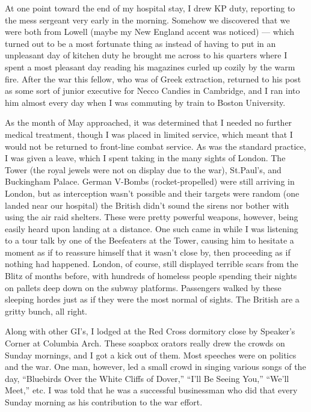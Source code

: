 \documentclass[../m3y]{subfiles}
\begin{document}
At one point toward the end of my hospital stay, I drew KP duty, reporting to the mess sergeant very early in the morning. Somehow we discovered that we were both from Lowell (maybe my New England accent was noticed) --- which turned out to be a most fortunate thing as instead of having to put in an unpleasant day of kitchen duty he brought me across to his quarters where I spent a most pleasant day reading his magazines curled up cozily by the warm fire. After the war this fellow, who was of Greek extraction, returned to his post as some sort of junior executive for Necco Candies in Cambridge, and I ran into him almost every day when I was commuting by train to Boston University.

As the month of May approached, it was determined that I needed no further medical treatment, though I was placed in limited service, which meant that I would not be returned to front-line combat service. As was the standard practice, I was given a leave, which I spent taking in the many sights of London. The Tower (the royal jewels were not on display due to the war), St.\@ Paul's, and Buckingham Palace. German V-Bombs (rocket-propelled) were still arriving in London, but as interception wasn't possible and their targets were random (one landed near our hospital) the British didn't sound the sirens nor bother with using the air raid shelters. These were pretty powerful weapons, however, being easily heard upon landing at a distance. One such came in while I was listening to a tour talk by one of the Beefeaters at the Tower, causing him to hesitate a moment as if to reassure himself that it wasn't close by, then proceeding as if nothing had happened. London, of course, still displayed terrible scars from the Blitz of months before, with hundreds of homeless people spending their nights on pallets deep down on the subway platforms. Passengers walked by these sleeping hordes just as if they were the most normal of sights. The British are a gritty bunch, all right.

Along with other GI's, I lodged at the Red Cross dormitory close by Speaker's Corner at Columbia Arch. These soapbox orators really drew the crowds on Sunday mornings, and I got a kick out of them. Most speeches were on politics and the war. One man, however, led a small crowd in singing various songs of the day, ``Bluebirds Over the White Cliffs of Dover,'' ``I'll Be Seeing You,'' ``We'll Meet,'' etc\@. I was told that he was a successful businessman who did that every Sunday morning as his contribution to the war effort.
\end{document}
